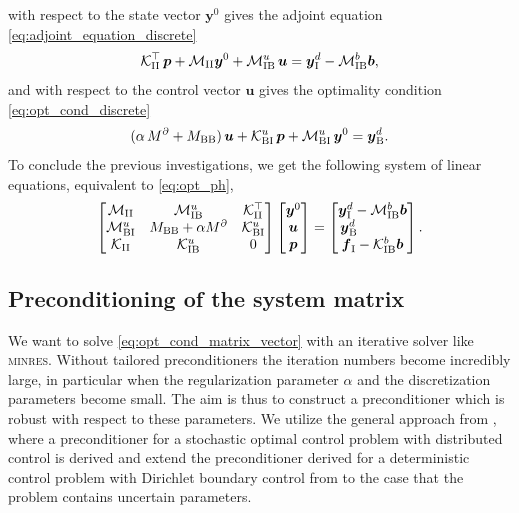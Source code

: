 \documentclass[a4paper,10pt]{article}
\newcommand{\cK}{{\mathcal{K}}}
\newcommand{\cM}{{\mathcal{M}}}
\numberwithin{theorem}{section}
\begin{document}
with respect to the state vector $\boldsymbol{y}^0$ gives the adjoint equation \eqref{eq:adjoint_equation_discrete}
\begin{equation*}
	\cK_{\textup{II}}^\top \,\boldsymbol{p} + \cM_{\textup{II}} \boldsymbol{y}^0
	+ \cM_{\textup{IB}}^u\, \boldsymbol{u} = \boldsymbol{y}^d_{\textup{I}} - \cM_{\textup{IB}}^b\boldsymbol b,
\end{equation*}
and with respect to the control vector $\boldsymbol{u}$ gives the optimality condition \eqref{eq:opt_cond_discrete}
\begin{equation*}
	(\alpha\,M^\partial + M_{\textup{BB}}) \,\boldsymbol u + \mathcal K_{\textup{BI}}^u\,\boldsymbol{p} + \mathcal M_{\textup{BI}}^u\,\boldsymbol{y}^0
	 = \boldsymbol{y}^d_{\textup{B}}.
\end{equation*}
To conclude the previous investigations, we get the following system of linear equations, equivalent to \eqref{eq:opt_ph},
\begin{equation}\label{eq:opt_cond_matrix_vector}
  \begin{bmatrix}
    \cM_{\textup{II}} & \cM_{\textup{IB}}^u & \cK_{\textup{II}}^\top \\
    \cM_{\textup{BI}}^u & M_{\textup{BB}} + \alpha M^\partial & \cK_{\textup{BI}}^u \\
    \cK_{\textup{II}} & \cK_{\textup{IB}}^u & 0
  \end{bmatrix}
  \begin{bmatrix}
    \boldsymbol{y}^0 \\
    \boldsymbol{u} \\
    \boldsymbol{p}
  \end{bmatrix}
  =
  \begin{bmatrix}
    \boldsymbol{y}^d_{\textup{I}} - \cM_{\textup{IB}}^b \boldsymbol b \\
    \boldsymbol{y}^d_{\textup{B}} \phantom{- \cM_{\textup{IB}}^b \boldsymbol b}\\
    \boldsymbol{f}_{\textup{I}} - \mathcal K_{\textup{IB}}^b\boldsymbol{b}
  \end{bmatrix}.
\end{equation}

\subsection{Preconditioning of the system matrix}
\label{sec:preconditioning}

We want to solve \eqref{eq:opt_cond_matrix_vector}  with an iterative solver like \textsc{minres}. Without tailored preconditioners the iteration numbers become incredibly large, in particular when the regularization parameter $\alpha$ and the discretization parameters become small. The aim is thus to construct a preconditioner which is robust with respect to these parameters. We utilize the general approach from \cite{PBenner_AOnwunto_MStoll_2016}, where a preconditioner for a stochastic optimal control problem with distributed control is derived and extend the preconditioner derived for a deterministic control problem with Dirichlet boundary control from \cite{StollWinkler2021} to the case that the problem contains uncertain parameters.
\end{document}
